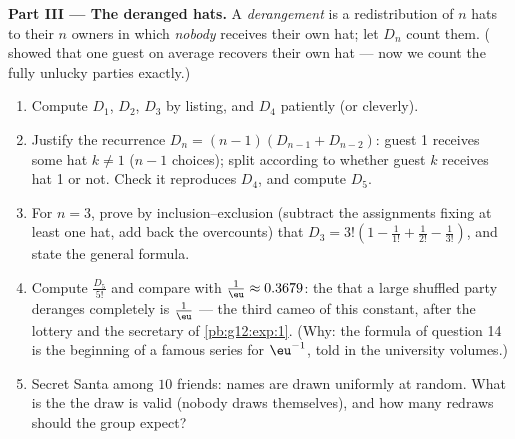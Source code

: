 \begin{problem}
\medskip
\noindent\textbf{Part III --- The deranged hats.}
A \emph{derangement} is a redistribution of $n$ hats to their
$n$ owners in which \emph{nobody} receives their own hat; let
$D_n$ count them. ( showed that one guest
on average recovers their own hat --- now we count the fully
unlucky parties exactly.)
\begin{enumerate}[resume]
  \item Compute $D_1$, $D_2$, $D_3$ by listing, and $D_4$
        patiently (or cleverly).
  \item Justify the recurrence
        $D_n = (n - 1)\left(D_{n-1} + D_{n-2}\right)$: guest 1
        receives some hat $k \neq 1$ ($n - 1$ choices); split
        according to whether guest $k$ receives hat 1 or not.
        Check it reproduces $D_4$, and compute $D_5$.
  \item For $n = 3$, prove by inclusion--exclusion (subtract
        the assignments fixing at least one hat, add back the
        overcounts) that
        $D_3 = 3!\left(1 - \frac{1}{1!} + \frac{1}{2!} -
        \frac{1}{3!}\right)$, and state the general formula.
  \item Compute $\frac{D_5}{5!}$ and compare with
        $\frac1\eu \approx 0.3679$: the  that a
        large shuffled party deranges completely is
        $\frac1\eu$ --- the third cameo of this constant, after
        the lottery and the secretary of \cref{pb:g12:exp:1}.
        (Why: the formula of question 14 is the beginning of a
        famous series for $\eu^{-1}$, told in the university
        volumes.)
  \item Secret Santa among $10$ friends: names are drawn
        uniformly at random. What is the  the draw
        is valid (nobody draws themselves), and how many
        redraws should the group expect?
\end{enumerate}


\end{problem}
